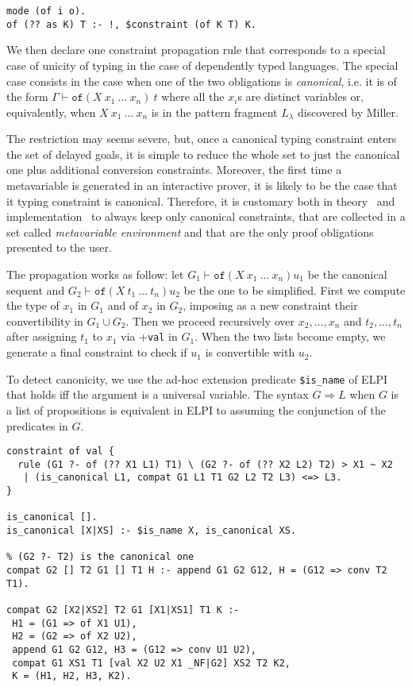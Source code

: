 \documentclass{easychair}
\begin{document}
\begin{verbatim}
mode (of i o).
of (?? as K) T :- !, $constraint (of K T) K.
\end{verbatim}

We then declare one constraint propagation rule that corresponds to a special case of unicity of typing in the case of dependently typed languages. The special case consists in the case when one of the two obligations is \emph{canonical}, i.e. it is of the form $\Gamma \vdash \mathtt{of} (X~x_1~\ldots~x_n)~t$ where all the $x_i$s are distinct variables or, equivalently, when $X~x_1~\ldots~x_n$ is in the pattern fragment $L_\lambda$ discovered by Miller.

The restriction may seems severe, but, once a canonical typing constraint enters the set of delayed goals, it is simple to reduce the whole set to just the canonical one plus additional conversion constraints. Moreover, the first time a metavariable is generated in an interactive prover, it is likely to be the case that it typing constraint is canonical. Therefore, it is customary both in theory~\cite{jojgov} and implementation~\cite{bidir} to always keep only canonical constraints, that are collected in a set called \emph{metavariable environment} and that are the only proof obligations presented to the user.

The propagation works as follow: let $G_1 \vdash \mathtt{of} (X~x_1~\ldots~x_n) u_1$ be the canonical sequent and $G_2 \vdash \mathtt{of} (X~t_1~\ldots~t_n) u_2$ be the one to be simplified. First we compute the type of $x_1$ in $G_1$ and of $x_2$ in $G_2$, imposing as a new constraint their convertibility in $G_1 \cup G_2$. Then we proceed recursively over $x_2,\ldots,x_n$ and $t_2,\ldots,t_n$ after assigning $t_1$ to $x_1$ via +\verb+val+ in $G_1$. When the two lists become empty, we generate a final constraint to check if $u_1$ is convertible with $u_2$.

To detect canonicity, we use the ad-hoc extension predicate \verb+$is_name+ of ELPI that holds iff the argument is a universal variable. The syntax $G \Rightarrow L$ when $G$ is a list of propositions is equivalent in ELPI to assuming the conjunction of the predicates in $G$.

\begin{verbatim}
constraint of val {
  rule (G1 ?- of (?? X1 L1) T1) \ (G2 ?- of (?? X2 L2) T2) > X1 ~ X2
   | (is_canonical L1, compat G1 L1 T1 G2 L2 T2 L3) <=> L3.
}

is_canonical [].
is_canonical [X|XS] :- $is_name X, is_canonical XS.

% (G2 ?- T2) is the canonical one
compat G2 [] T2 G1 [] T1 H :- append G1 G2 G12, H = (G12 => conv T2 T1).

compat G2 [X2|XS2] T2 G1 [X1|XS1] T1 K :-
 H1 = (G1 => of X1 U1),
 H2 = (G2 => of X2 U2),
 append G1 G2 G12, H3 = (G12 => conv U1 U2),
 compat G1 XS1 T1 [val X2 U2 X1 _NF|G2] XS2 T2 K2,
 K = (H1, H2, H3, K2).
\end{verbatim}
\end{document}
